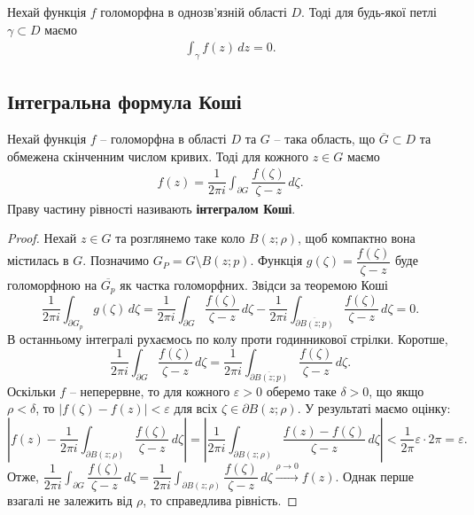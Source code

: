 \documentclass{math_library}
\begin{document}
\begin{corollary}
Нехай функція $f$ голоморфна в однозв'язній області $D$. Тоді для будь-якої петлі $\gamma \subset D$ маємо
\begin{align*}
\int_\gamma f(z)\,dz = 0.
\end{align*} 
\end{corollary}

\subsection{Інтегральна формула Коші}
\begin{theorem}
Нехай функція $f$ -- голоморфна в області $D$ та $G$ -- така область, що $\overline{G} \subset D$ та обмежена скінченним числом кривих. Тоді для кожного $z \in G$ маємо
\begin{align*}
f(z) = \dfrac{1}{2 \pi i} \int_{\partial G} \dfrac{f(\zeta)}{\zeta - z}\,d\zeta.
\end{align*}
Праву частину рівності називають \textbf{інтегралом Коші}.
\end{theorem}

\begin{proof}
Нехай $z \in G$ та розглянемо таке коло $B(z;\rho)$, щоб компактно вона містилась в $G$. Позначимо $G_P = G \setminus B(z;p)$. Функція $g(\zeta) = \dfrac{f(\zeta)}{\zeta - z}$ буде голоморфною на $\overline{G_p}$ як частка голоморфних. Звідси за теоремою Коші
\[
\dfrac{1}{2\pi i} \int_{\partial G_p} g(\zeta) \,d\zeta = \dfrac{1}{2 \pi i} \int_{\partial G} \dfrac{f(\zeta)}{\zeta - z}\,d\zeta - \dfrac{1}{2\pi i} \int_{\overline{\partial B(z;p)}} \dfrac{f(\zeta)}{\zeta - z}\,d\zeta = 0.
\]
В останньому інтегралі рухаємось по колу проти годинникової стрілки. Коротше,
\[
\dfrac{1}{2 \pi i} \int_{\partial G} \dfrac{f(\zeta)}{\zeta - z}\,d\zeta = \dfrac{1}{2\pi i} \int_{\overline{\partial B(z;p)}} \dfrac{f(\zeta)}{\zeta - z}\,d\zeta.
\]
Оскільки $f$ -- неперервне, то для кожного $\varepsilon > 0$ оберемо таке $\delta > 0$, що якщо $\rho < \delta$, то $|f(\zeta) - f(z)| < \varepsilon$ для всіх $\zeta \in \partial B(z;\rho)$. У результаті маємо оцінку:
\[
\left| f(z) - \dfrac{1}{2\pi i} \int_{\partial B(z;\rho)} \dfrac{f(\zeta)}{\zeta - z}\,d\zeta \right| = \left| \dfrac{1}{2\pi i} \int_{\partial B(z;\rho)} \dfrac{f(z)-f(\zeta)}{\zeta-z}\,d\zeta \right| < \dfrac{1}{2\pi} \varepsilon \cdot 2\pi = \varepsilon.
\]
Отже, $\displaystyle \dfrac{1}{2\pi i} \int_{\partial G} \dfrac{f(\zeta)}{\zeta - z}\,d\zeta = \dfrac{1}{2\pi i} \int_{\partial B(z;\rho)} \dfrac{f(\zeta)}{\zeta - z}\,d\zeta \overset{\rho \to 0}{\to} f(z)$. Однак перше взагалі не залежить від $\rho$, то справедлива рівність.
\end{proof}
\end{document}
